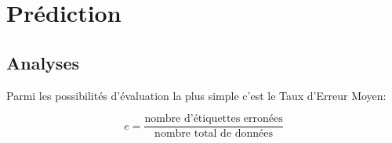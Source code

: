 \documentclass{article}
\begin{document}






\section{Prédiction}
\subsection{Analyses}
Parmi les possibilités d'évaluation la plus simple c'est le Taux d'Erreur Moyen:
\begin{definition}
    \begin{equation}
        \boxed{
            e = \frac{\text{nombre d'étiquettes erronées}}{\text{nombre total de données}}
        }
    \end{equation}
\end{definition}
\end{document}
